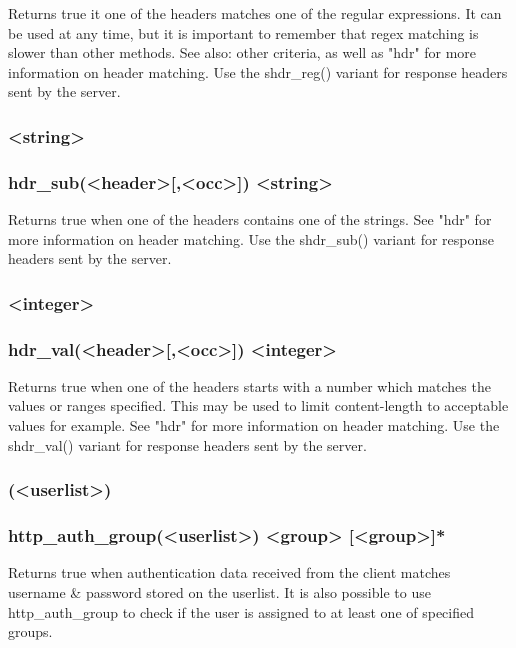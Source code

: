   Returns true it one of the headers matches one of the regular expressions. It
  can be used at any time, but it is important to remember that regex matching
  is slower than other methods. See also: other  criteria, as well as
  "hdr" for more information on header matching. Use the shdr\_reg() variant for
  response headers sent by the server.

\subsubsection[hdr\_sub]{ <string>}
\subsubsection*{hdr\_sub(<header>[,<occ>]) <string>}

  Returns true when one of the headers contains one of the strings. See "hdr"
  for more information on header matching. Use the shdr\_sub() variant for
  response headers sent by the server.

\subsubsection[hdr\_val]{ <integer>}
\subsubsection*{hdr\_val(<header>[,<occ>]) <integer>}

  Returns true when one of the headers starts with a number which matches the
  values or ranges specified. This may be used to limit content-length to
  acceptable values for example. See "hdr" for more information on header
  matching. Use the shdr\_val() variant for response headers sent by the server.

\subsubsection[http\_auth]{(<userlist>)}
\subsubsection[http\_auth\_group]{http\_auth\_group(<userlist>) <group> [<group>]*}

  Returns true when authentication data received from the client matches
  username \& password stored on the userlist. It is also possible to
  use http\_auth\_group to check if the user is assigned to at least one
  of specified groups.

